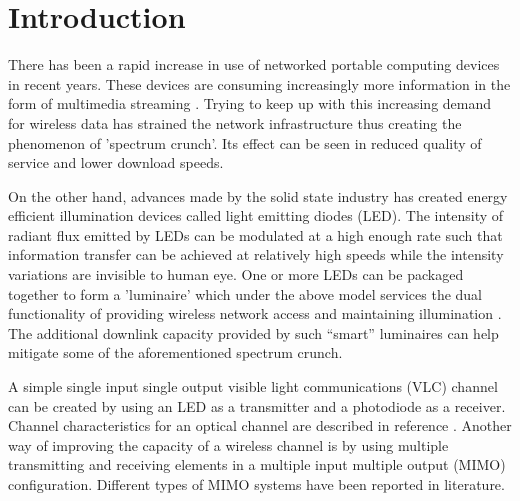\section{Introduction}
There has been a rapid increase in use of networked portable computing devices in recent years. These devices are consuming increasingly more information in the form of multimedia streaming \cite{cis14a}. Trying to keep up with this increasing demand for wireless data has strained the network infrastructure thus creating the phenomenon of 'spectrum crunch'. Its effect can be seen in reduced quality of service and lower download speeds. 

On the other hand, advances made by the solid state industry has created energy efficient illumination devices called light emitting diodes (LED). The intensity of radiant flux emitted by LEDs can be modulated at a high enough rate such that information transfer can be achieved at relatively high speeds while the intensity variations are invisible to human eye. One or more LEDs can be packaged together to form a 'luminaire' which under the above model services the dual functionality of providing wireless network access and maintaining illumination \cite{kom04a}. The additional downlink capacity provided by such ``smart'' luminaires can help mitigate some of the aforementioned spectrum crunch.

A simple single input single output visible light communications (VLC) channel can be created by using an LED as a transmitter and a photodiode as a receiver. Channel characteristics for an optical channel are described in reference \cite{kah97a}. Another way of improving the capacity of a wireless channel is by using multiple transmitting and receiving elements in a multiple input multiple output (MIMO) configuration. Different types of MIMO systems \cite{hra06a,zen09a,ash10a,but13a,but14b} have been reported in literature.

